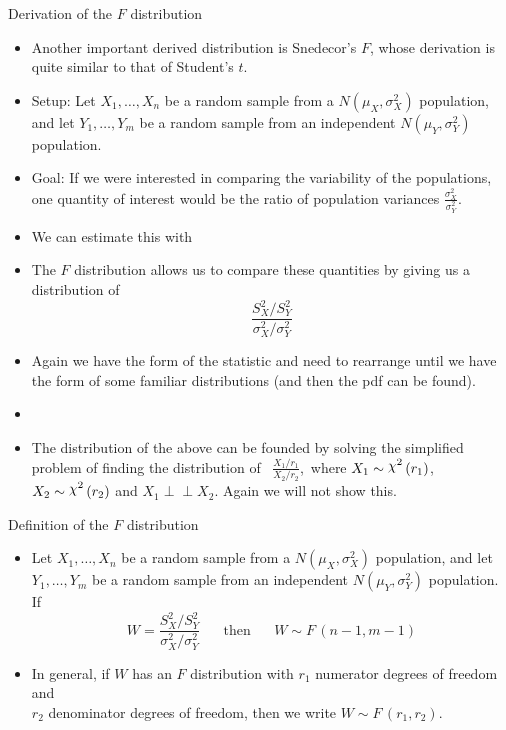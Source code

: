 \documentclass{article}
\newcommand{\vecn}[2]{#1_1, \ldots, #1_{#2}}	%
\newcommand{\ind}{\perp \!\!\! \perp}			%
\newcommand{\follow}[1]{\sim \text{#1}\,}		%
\newcommand{\chisq}{\raisebox{2pt}{$\chi^2$}}		%
\begin{document}
Derivation of the $F$ distribution\bigskip
\begin{itemize}
    \item Another important derived distribution is Snedecor's $F$, whose derivation is quite similar to that of Student's $t$.\bigskip
    \item Setup: Let $\vecn{X}{n}$ be a random sample from a $N(\mu_X, \sigma^2_X)$ population, and let $\vecn{Y}{m}$ be a random sample from an independent $N(\mu_Y, \sigma^2_Y)$ population.
    \item Goal: If we were interested in comparing the variability of the populations, one quantity of interest would be the ratio of population variances $\displaystyle \frac{\sigma^2_X}{\sigma^2_Y}$.
    \item[] We can estimate this with\bigskip
    \item The $F$ distribution allows us to compare these quantities by giving us a distribution of
    \[\frac{S^2_X / S^2_Y}{\sigma^2_X / \sigma^2_Y}\]
    \item Again we have the form of the statistic and need to rearrange until we have the form of some familiar distributions (and then the pdf can be found).\newpage
    \item[] \hspace{10pt} \vspace{300pt}
    \item The distribution of the above can be founded by solving the simplified problem of finding the distribution of \, $\displaystyle \frac{X_1 / r_1}{X_2 / r_2}$, \,where $X_1 \follow{\chisq}(r_1)$, $X_2 \follow{\chisq}(r_2)$ and $X_1 \ind X_2$. Again we will not show this.
\end{itemize}\bigskip

Definition of the $F$ distribution\bigskip
\begin{itemize}
    \item Let $\vecn{X}{n}$ be a random sample from a $N(\mu_X, \sigma^2_X)$ population, and let $\vecn{Y}{m}$ be a random sample from an independent $N(\mu_Y, \sigma^2_Y)$ population. If
    \[W = \frac{S^2_X / S^2_Y}{\sigma^2_X / \sigma^2_Y} \hspace{20pt} \text{then} \hspace{20pt} W \follow{$F$}(n-1, m-1)\]
    \item[] In general, if $W$ has an $F$ distribution with $r_1$ numerator degrees of freedom and \\ $r_2$ denominator degrees of freedom, then we write $W \follow{$F$}(r_1, r_2)$.
\end{itemize}\bigskip
\end{document}
